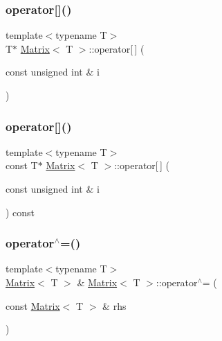 \subsubsection{\texorpdfstring{operator[]()}{operator[]()}\hspace{0.1cm}{\footnotesize\ttfamily [1/2]}}
{\footnotesize\ttfamily template$<$typename T$>$ \\
T$\ast$ \mbox{\hyperlink{classMatrix}{Matrix}}$<$ T $>$\+::operator\mbox{[}$\,$\mbox{]} (\begin{DoxyParamCaption}\item[{const unsigned int \&}]{i }\end{DoxyParamCaption})\hspace{0.3cm}{\ttfamily [inline]}}

\mbox{\label{classMatrix_af58cf6372d17f7abf5396d32f3ef5cd7}} 
\subsubsection{\texorpdfstring{operator[]()}{operator[]()}\hspace{0.1cm}{\footnotesize\ttfamily [2/2]}}
{\footnotesize\ttfamily template$<$typename T$>$ \\
const T$\ast$ \mbox{\hyperlink{classMatrix}{Matrix}}$<$ T $>$\+::operator\mbox{[}$\,$\mbox{]} (\begin{DoxyParamCaption}\item[{const unsigned int \&}]{i }\end{DoxyParamCaption}) const\hspace{0.3cm}{\ttfamily [inline]}}

\mbox{\label{classMatrix_acf14abe2000a4a41dae10db14b5d039c}} 
\subsubsection{\texorpdfstring{operator$^\wedge$=()}{operator^=()}\hspace{0.1cm}{\footnotesize\ttfamily [1/2]}}
{\footnotesize\ttfamily template$<$typename T$>$ \\
\mbox{\hyperlink{classMatrix}{Matrix}}$<$ T $>$ \& \mbox{\hyperlink{classMatrix}{Matrix}}$<$ T $>$\+::operator$^\wedge$= (\begin{DoxyParamCaption}\item[{const \mbox{\hyperlink{classMatrix}{Matrix}}$<$ T $>$ \&}]{rhs }\end{DoxyParamCaption})\hspace{0.3cm}{\ttfamily [inline]}}




